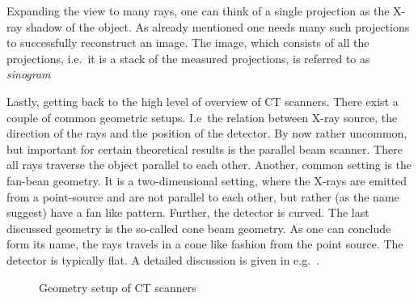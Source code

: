 Expanding the view to many rays, one can think of a single projection as the X-ray shadow of the
object. As already mentioned one needs many such projections to successfully reconstruct an image.
The image, which consists of all the projections, i.e.\ it is a stack of the measured
projections, is referred to as \textit{sinogram}


Lastly, getting back to the high level of overview of CT scanners. There exist a couple of common
geometric setups. I.e\ the relation between X-ray source, the direction of the rays and the position
of the detector. By now rather uncommon, but important for certain theoretical results is the
parallel beam scanner. There all rays traverse the object parallel to each other. Another, common
setting is the fan-bean geometry. It is a two-dimensional setting, where the X-rays are emitted
from a point-source and are not parallel to each other, but rather (as the name suggest) have a fan
like pattern. Further, the detector is curved. The last discussed geometry is the so-called cone
beam geometry. As one can conclude form its name, the rays travels in a cone like fashion from the
point source. The detector is typically flat. A detailed discussion is given in
e.g.\ \cite{buzug_computed_2008}.

\begin{figure}[t]
	\centering

	\caption{Geometry setup of CT scanners}\label{fig:ct_geometry_setup}
\end{figure}

